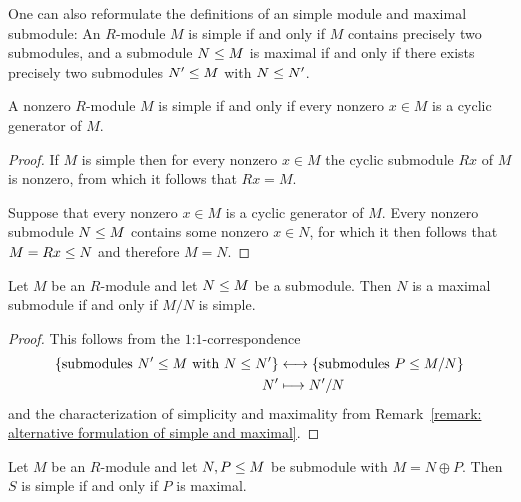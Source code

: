 \begin{remark}
  \label{remark: alternative formulation of simple and maximal}
  One can also reformulate the definitions of an simple module and maximal submodule:
  An $R$-module $M$ is simple if and only if $M$ contains precisely two submodules, and a submodule $N \leq M$ is maximal if and only if there exists precisely two submodules $N' \leq M$ with $N \leq N'$.
\end{remark}


\begin{lemma}
  \label{lemma: simple iff every cyclic generator}
  A nonzero $R$-module $M$ is simple if and only if every nonzero $x \in M$ is a cyclic generator of $M$. 
\end{lemma}


\begin{proof}
  If $M$ is simple then for every nonzero $x \in M$ the cyclic submodule $Rx$ of $M$ is nonzero, from which it follows that $Rx = M$.
  
  Suppose that every nonzero $x \in M$ is a cyclic generator of $M$.
  Every nonzero submodule $N \leq M$ contains some nonzero $x \in N$, for which it then follows that $M = Rx \leq N$ and therefore $M = N$.
\end{proof}


\begin{lemma}
  \label{lemma: maximal iff quotient is simple}
  Let $M$ be an $R$-module and let $N \leq M$ be a submodule.
  Then $N$ is a maximal submodule if and only if $M/N$ is simple.
\end{lemma}


\begin{proof}
  This follows from the $1$:$1$-correspondence
  \begin{align*}
    \{ \text{submodules $N' \leq M$ with $N \leq N'$} \}
    &\longleftrightarrow
    \{ \text{submodules $P \leq M/N$} \}
    \\
                  N'
    &\longmapsto  N'/N
  \end{align*}
  and the characterization of simplicity and maximality from Remark~\ref{remark: alternative formulation of simple and maximal}.
\end{proof}


\begin{corollary}
  Let $M$ be an $R$-module and let $N, P \leq M$ be submodule with $M = N \oplus P$.
  Then $S$ is simple if and only if $P$ is maximal.
\end{corollary}


